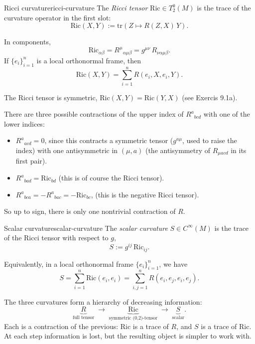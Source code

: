 \begin{colordef}{Ricci curvature}{ricci-curvature}
The \emph{Ricci tensor} $\mathrm{Ric} \in T^0_2(M)$ is the trace of the curvature operator in the first slot:
\[
\mathrm{Ric}(X, Y) := \mathrm{tr}\!\left(Z \mapsto R(Z, X)\, Y\right).
\]
\end{colordef}
In components,
\[
\mathrm{Ric}_{\alpha\beta} = R^\mu{}_{\alpha\mu\beta} = g^{\mu\nu}\, R_{\nu\alpha\mu\beta}.
\]
If $\{e_i\}_{i=1}^n$ is a local orthonormal frame, then
\[
\mathrm{Ric}(X, Y) = \sum_{i=1}^n R(e_i, X, e_i, Y).
\]

The Ricci tensor is symmetric, $\mathrm{Ric}(X, Y) = \mathrm{Ric}(Y, X)$ (see Exercis 9.1a).
\begin{colremark}{}
There are three possible contractions of the upper index of $R^a{}_{bcd}$ with one of the lower indices:
\begin{itemize}
    \item $R^a{}_{acd} = 0$, since this contracts a symmetric tensor ($g^{a\mu}$, used to raise the index) with one antisymmetric in $(\mu, a)$ (the antisymmetry of $R_{\mu acd}$ in its first pair).
    \item $R^a{}_{bad} = \mathrm{Ric}_{bd}$ (this is of course the Ricci tensor).
    \item $R^a{}_{bca} = -R^a{}_{bac} = -\mathrm{Ric}_{bc}$, (this is the negative Ricci tensor).
\end{itemize}
So up to sign, there is only one nontrivial contraction of $R$.
\end{colremark}






\begin{colordef}{Scalar curvature}{scalar-curvature}
The \emph{scalar curvature} $S \in C^\infty(M)$ is the trace of the Ricci tensor with respect to $g$,
\[
S := g^{ij}\, \mathrm{Ric}_{ij}.
\]
\end{colordef}
Equivalently, in a local orthonormal frame $\{e_i\}_{i=1}^n$, we have
\[
S = \sum_{i=1}^n \mathrm{Ric}(e_i, e_i) = \sum_{i,j=1}^n R(e_i, e_j, e_i, e_j).
\]

The three curvatures form a hierarchy of decreasing information:
\[
\underbrace{R}_{\text{full tensor}} \;\longrightarrow\; \underbrace{\mathrm{Ric}}_{\text{symmetric (0,2)-tensor}} \;\longrightarrow\; \underbrace{S}_{\text{scalar}}.
\]
Each is a contraction of the previous: $\mathrm{Ric}$ is a trace of $R$, and $S$ is a trace of $\mathrm{Ric}$. At each step information is lost, but the resulting object is simpler to work with.

